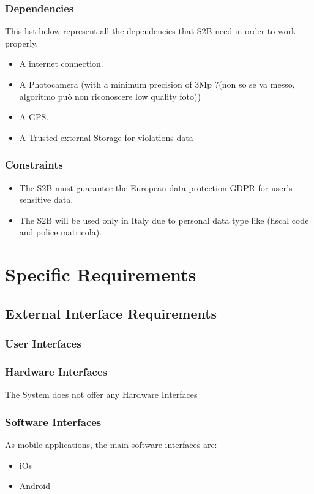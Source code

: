 \documentclass{article}
\begin{document}
\subsubsection{Dependencies}
This list below represent all the dependencies that S2B need in order to work properly.
\begin{itemize}
    \item A internet connection.
    \item A Photocamera (with a minimum precision of 3Mp ?(non so se va messo, algoritmo può non riconoscere low quality foto))
    \item A GPS.
    \item A Trusted external Storage for violations data   
\end{itemize}

\subsubsection{Constraints}
\begin{itemize}
    \item The S2B must guarantee the European data protection GDPR for user's sensitive data.
    \item The S2B will be used only in Italy due to personal data type like (fiscal code and police matricola).
\end{itemize}

\section{Specific Requirements}

\subsection{External Interface Requirements}
\subsubsection{User Interfaces}
\subsubsection{Hardware Interfaces}
The System does not offer any Hardware Interfaces
\subsubsection{Software Interfaces}
As mobile applications, the main software interfaces are:
\begin{itemize}
    \item iOs
    \item Android
\end{itemize}
\end{document}
